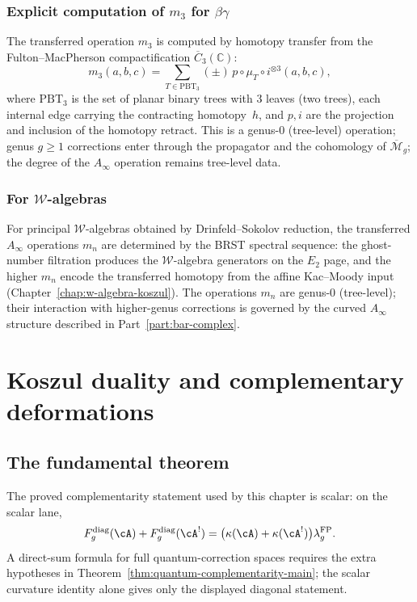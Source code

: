 \subsubsection{\texorpdfstring{Explicit computation of $m_3$ for $\beta\gamma$}{Explicit computation of m 3 for beta-gamma}}

The transferred operation $m_3$ is computed by homotopy transfer from
the Fulton--MacPherson compactification $\overline{C}_3(\mathbb{C})$:
\begin{equation}
m_3(a, b, c)
= \sum_{T \in \mathrm{PBT}_3}
 (\pm)\, p \circ \mu_T \circ i^{\otimes 3}(a, b, c),
\end{equation}
where $\mathrm{PBT}_3$ is the set of planar binary trees with $3$
leaves (two trees), each internal edge carrying the contracting
homotopy~$h$, and $p, i$ are the projection and inclusion of the
homotopy retract. This is a genus-$0$ (tree-level) operation;
genus $g \geq 1$ corrections enter through the propagator and the
cohomology of $\overline{\mathcal{M}}_g$; the degree of the
$A_\infty$ operation remains tree-level data.

\subsubsection{For $\mathcal{W}$-algebras}

For principal $\mathcal{W}$-algebras obtained by Drinfeld--Sokolov
reduction, the transferred $A_\infty$ operations $m_n$ are
determined by the BRST spectral sequence: the ghost-number
filtration produces the $\mathcal{W}$-algebra generators on the
$E_2$ page, and the higher $m_n$ encode the
transferred homotopy from the affine Kac--Moody input
(Chapter~\ref{chap:w-algebra-koszul}). The operations $m_n$ are
genus-$0$ (tree-level); their interaction with higher-genus
corrections is governed by the curved $A_\infty$ structure
described in Part~\ref{part:bar-complex}.

\section{Koszul duality and complementary deformations}

\subsection{The fundamental theorem}

\begin{remark}
\label{rem:koszul-complementarity-higher-genus}
The proved complementarity statement used by this chapter is scalar:
on the scalar lane,
\[
F_g^{\mathrm{diag}}(\cA)+F_g^{\mathrm{diag}}(\cA^!)
  =\bigl(\kappa(\cA)+\kappa(\cA^!)\bigr)\lambda_g^{\mathrm{FP}}.
\]
A direct-sum formula for full quantum-correction spaces requires the
extra hypotheses in Theorem~\ref{thm:quantum-complementarity-main};
the scalar curvature identity alone gives only the displayed diagonal
statement.
\end{remark}

